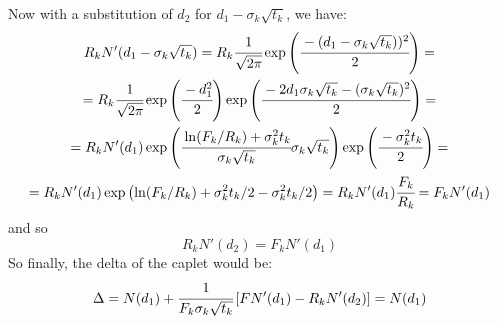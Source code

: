\documentclass[12pt,a4paper]{book}
\begin{document}
\begin{solution}
Now with a substitution of $d_2$ for $d_1-\sigma_k\sqrt{t_k}$, we have:
\begin{equation*}
\begin{gathered}
R_kN'(d_1 - \sigma_k\sqrt{t_k}) = R_k\cfrac{1}{\sqrt{2\pi}}\exp\left(\cfrac{-(d_1-\sigma_k\sqrt{t_k}))^2}{2}\right) = \\
= R_k\cfrac{1}{\sqrt{2\pi}}\exp\left(\cfrac{-d_1^2}{2}\right)\exp\left(\cfrac{-2d_1\sigma_k\sqrt{t_k}-(\sigma_k\sqrt{t_k})^2}{2}\right) = \\  = R_kN'(d_1)\exp\left(\cfrac{\ln(F_k/R_k)+\sigma_k^2t_k}{\sigma_k\sqrt{t_k}}\sigma_k\sqrt{t_k}\right)\exp\left(\cfrac{-\sigma_k^2t_k}{2}\right) = \\
=R_kN'(d_1)\exp\left(\ln(F_k/R_k)+\sigma^2_kt_k/2-\sigma^2_kt_k/2\right) = R_kN'(d_1)\cfrac{F_k}{R_k} = F_kN'(d_1)
\end{gathered}
\end{equation*}
and so
\begin{equation*}
	R_kN'(d_2)=F_kN'(d_1)
\end{equation*}
So finally, the delta of the caplet would be:
\begin{equation*}
\Delta = N(d_1) + \cfrac{1}{F_k\sigma_k\sqrt{t_k}}\left[FN'(d_1)-R_kN'(d_2)\right] =
N(d_1)
\end{equation*}
\end{solution}

\end{document}
